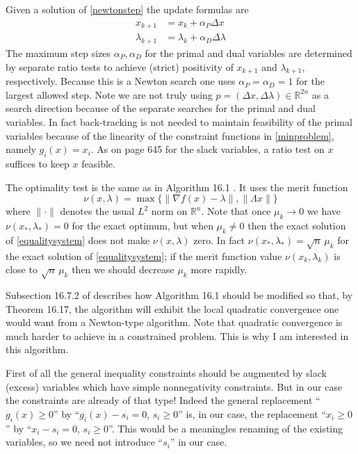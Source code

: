 \documentclass[11pt]{article}
\newcommand{\RR}{\mathbb{R}}
\newcommand{\grad}{\nabla}
\begin{document}
Given a solution of \eqref{newtonstep} the update formulas are
\begin{align*}
x_{k+1} &= x_k + \alpha_P \Delta x \\
\lambda_{k+1} &= \lambda_k + \alpha_D \Delta \lambda
\end{align*}
The maximum step sizes $\alpha_P,\alpha_D$ for the primal and dual variables are determined by separate ratio tests to achieve (strict) positivity of $x_{k+1}$ and $\lambda_{k+1}$, respectively.  Because this is a Newton search one uses $\alpha_P=\alpha_D=1$ for the largest allowed step.  Note we are not truly using $p=(\Delta x,\Delta \lambda) \in \RR^{2n}$ as a search direction because of the separate searches for the primal and dual variables.  In fact back-tracking is not needed to maintain feasibility of the primal variables because of the linearity of the constraint functions in \eqref{minproblem}, namely $g_i(x)=x_i$.  As on page 645 for the slack variables, a ratio test on $x$ suffices to keep $x$ feasible.

The optimality test is the same as in Algorithm 16.1 \cite{GrivaNashSofer2009}.  It uses the merit function
\begin{equation}
    \nu(x,\lambda) = \max\{\|\grad f(x)-\lambda\|,\|\Lambda x\|\}  \label{merit}
\end{equation}
where $\|\cdot\|$ denotes the usual $L^2$ norm on $\RR^n$.  Note that once $\mu_k\to 0$ we have $\nu(x_*,\lambda_*) = 0$ for the exact optimum, but when $\mu_k \ne 0$ then the exact solution of \eqref{equalitysystem} does not make $\nu(x,\lambda)$ zero.  In fact $\nu(x_*,\lambda_*) = \sqrt{n}\, \mu_k$ for the exact solution of \eqref{equalitysystem}; if the merit function value $\nu(x_k,\lambda_k)$ is close to $\sqrt{n}\, \mu_k$ then we should decrease $\mu_k$ more rapidly.

Subsection 16.7.2 of \cite{GrivaNashSofer2009} describes how Algorithm 16.1 should be modified so that, by Theorem 16.17, the algorithm will exhibit the local quadratic convergence one would want from a Newton-type algorithm.  Note that quadratic convergence is much harder to achieve in a constrained problem.  This is why I am interested in this algorithm.

First of all the general inequality constraints should be augmented by slack (excess) variables which have simple nonnegativity constraints.  But in our case the constraints are already of that type!  Indeed the general replacement ``$g_i(x)\ge 0$'' by ``$g_i(x) - s_i =0$, $s_i\ge 0$'' is, in our case, the replacement ``$x_i\ge 0$'' by ``$x_i-s_i=0$, $s_i\ge 0$''.  This would be a meaningles renaming of the existing variables, so we need not introduce ``$s_i$'' in our case.
\end{document}

